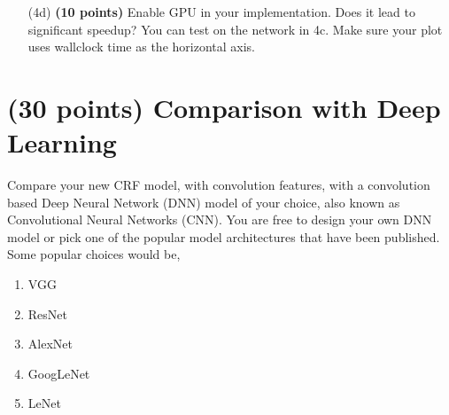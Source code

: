 \documentclass[11pt]{report}
\begin{document}
\begin{itemize}
{\bf Note.} In \verb#train.py#, what does \verb#embed_dim# = 64 mean? Typically layers are specified via the input and output dimensions that it produces. Here \verb#input_dim# corresponds to the input dimension that the layer takes in and the \verb#embed_dim# is the size of the embedding (output) that the layer produces. These are merely placeholders, meant to help you consider the input and output shapes while programming the CRF layer (and subsequently the conv layer). If this is confusing for you, feel free to setup your own mechanism to correctly handle input output shapes.
The question asks you to perform convolution with different filter shapes. So one way to handle output shapes correctly is to let your convolution layer automatically infer the output shape, given the input shape and filter size; some pointers:

https://fomoro.com/projects/project/receptive-field-calculator

{\bf Note.} Should we use Sequential to concatenate convolution layer and crf layer, or implement a CRF layer that entangles with a couple of convolution layers? Use Sequential. Pass a conv layer (it could be a stack of sequential conv layers) to CRF and use the \verb#get_conv_features#() method to get the features. This way, we are able to easily determine the valid letters from the input image as well. 


\item [(4d)] {\bf (10 points)} Enable GPU in your implementation. Does it lead
  to significant speedup? You can test on the network in 4c. Make sure your plot
  uses wallclock time as the horizontal axis.
\end{itemize}

\section{(30 points) Comparison with Deep Learning}
\label{sec:Analysis}

Compare your new CRF model, with convolution features, with a convolution based
Deep Neural Network (DNN) model of your choice, also known as Convolutional
Neural Networks (CNN). You are free to design your own DNN model or pick one of
the popular model architectures that have been published. Some popular choices
would be,

\vspace{-0.5em}
\begin{enumerate}
\item VGG \cite{ZisSimZis14}
\item ResNet \cite{SunHeZhaRenetal15a}
\item AlexNet \cite{HinKriSutHin12a}
\item GoogLeNet \cite{SerSzeLiuJiaetal14}
\item LeNet \cite{LecBotBenHaf98}
\end{enumerate}
\vspace{-0.5em}
\end{document}

